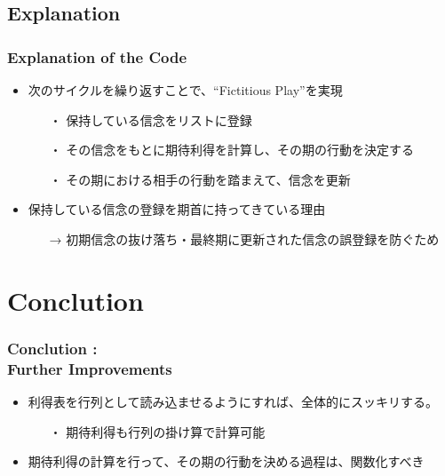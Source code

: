 \documentclass[dvipdfmx,11pt]{beamer}
\begin{document}
\subsection{Explanation}
\begin{frame}\frametitle{Explanation of the Code}
 \begin{itemize}
  \item 次のサイクルを繰り返すことで、``Fictitious Play''を実現
  \begin{itemize}
   \item[・] 保持している信念をリストに登録
   \item[・] その信念をもとに期待利得を計算し、その期の行動を決定する
   \item[・] その期における相手の行動を踏まえて、信念を更新
  \end{itemize}
  \item 保持している信念の登録を期首に持ってきている理由
  \begin{itemize}
   \item[→] 初期信念の抜け落ち・最終期に更新された信念の誤登録を防ぐため
  \end{itemize}
 \end{itemize}
\end{frame}

\section{Conclution}
\begin{frame}\frametitle{Conclution : \\Further Improvements}
 \begin{itemize}
  \item 利得表を行列として読み込ませるようにすれば、全体的にスッキリする。
  \begin{itemize}
   \item[・] 期待利得も行列の掛け算で計算可能
  \end{itemize}
  \item 期待利得の計算を行って、その期の行動を決める過程は、関数化すべき
 \end{itemize}
\end{frame}
\end{document}
